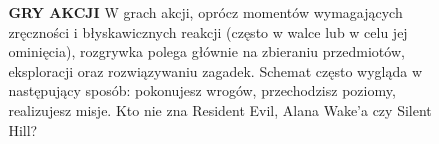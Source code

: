 \documentclass{beamer}
\begin{document}
\begin{frame} %
\begin{columns}
\begin{column}{0.5\textwidth}
    \begin{figure}
    \centering
        \includegraphics[width=5cm,height=6cm]{AW2.jpg}
\end{figure}
\end{column}

\begin{column}{0.5\textwidth}
	   \normalsize \textbf {GRY AKCJI}
\newline
 \small W grach akcji, oprócz momentów wymagających zręczności i błyskawicznych reakcji (często w walce lub w celu jej ominięcia), rozgrywka polega głównie na zbieraniu przedmiotów, eksploracji oraz rozwiązywaniu zagadek. Schemat często wygląda w następujący sposób: pokonujesz wrogów, przechodzisz poziomy, realizujesz misje. Kto nie zna Resident Evil, Alana Wake’a czy Silent Hill?
\end{column}
\end{columns}
\end{frame}
\end{document}
